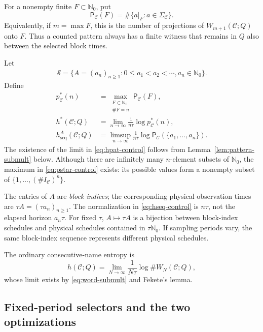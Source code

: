\documentclass[11pt,reqno]{amsart}
\numberwithin{equation}{section}
\theoremstyle{definition}
\newcommand{\Nzero}{\mathbb N_0}
\newcommand{\C}{\mathcal C}
\newcommand{\Patt}{\mathsf P}
\newcommand{\hseq}{h_{\mathrm{seq}}}
\newcommand{\hpat}{h^{*}}
\begin{document}
For a nonempty finite $F\subset\Nzero$, put
\begin{equation}\label{eq:control-pattern-count}
 \Patt_\C(F)=\#\{a|_F:a\in\Sigma_\C\}.
\end{equation}
Equivalently, if $m=\max F$, this is the number of projections of
$W_{m+1}(\C;Q)$ onto $F$.  Thus a counted pattern always has a finite witness
that remains in $Q$ also between the selected block times.

Let
\begin{align*}
 \mathscr S=\{A=(a_n)_{n\ge1}:0\le a_1<a_2<\cdots, a_n\in\Nzero\}.
\end{align*}
Define
\begin{align}
 p_\C^*(n)&=\max_{\substack{F\subset\Nzero\\\#F=n}}\Patt_\C(F),
 \label{eq:pstar-control}\\
 \hpat(\C;Q)&=\lim_{n\to\infty}\frac1{n\tau}\log p_\C^*(n),
 \label{eq:hpat-control}\\
 \hseq^A(\C;Q)&=\limsup_{n\to\infty}\frac1{n\tau}
 \log\Patt_\C(\{a_1,\ldots,a_n\}).
 \label{eq:hseq-control}
\end{align}
The existence of the limit in \eqref{eq:hpat-control} follows from
Lemma~\ref{lem:pattern-submult} below.  Although there are infinitely many
$n$-element subsets of $\Nzero$, the maximum in \eqref{eq:pstar-control}
exists: its possible values form a nonempty subset of
$\{1,\ldots,(\#I_\C)^n\}$.

The entries of $A$ are \emph{block indices}; the corresponding physical
observation times are $\tau A=(\tau a_n)_{n\ge1}$.  The normalization in
\eqref{eq:hseq-control} is $n\tau$, not the elapsed horizon $a_n\tau$.
For fixed $\tau$, $A\mapsto\tau A$ is a bijection between block-index
schedules and physical schedules contained in $\tau\Nzero$.  If sampling
periods vary, the same block-index sequence represents different physical
schedules.

The ordinary consecutive-name entropy is
\begin{equation}\label{eq:ordinary-partition-entropy}
 h(\C;Q)=\lim_{N\to\infty}\frac1{N\tau}\log\#W_N(\C;Q),
\end{equation}
whose limit exists by \eqref{eq:word-submult} and Fekete's lemma.


\subsection{Fixed-period selectors and the two optimizations}\label{sec:selectors}
\end{document}
